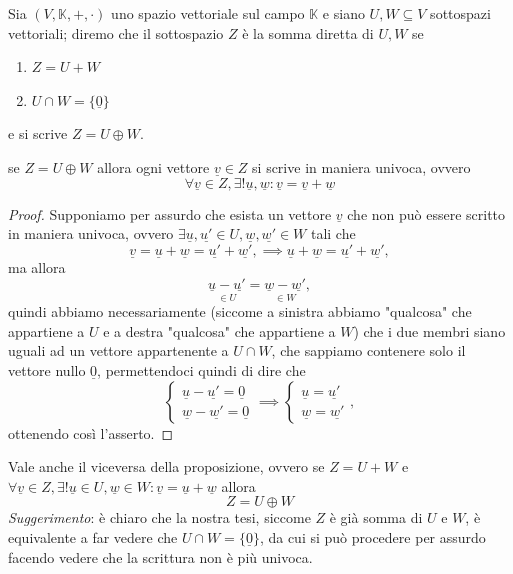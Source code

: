 \begin{definition}
    Sia $(V, \mathbb{K}, +, \cdot)$ uno spazio vettoriale sul campo $\mathbb{K}$ e siano $U, W \subseteq V$ sottospazi vettoriali; diremo che il sottospazio $Z$ è la somma diretta di $U, W$ se
    \begin{enumerate}[label=\protect\circled{\arabic*}]
        \item $Z = U + W$
        \item $U \cap W = \{ \underline{0} \}$
    \end{enumerate}
    e si scrive $Z = U \oplus W$.
\end{definition}
\begin{prop}
    se $Z = U \oplus W$ allora ogni vettore $\underline{v} \in Z$ si scrive in maniera univoca, ovvero
    $$
        \forall \underline{v} \in Z, \exists! \underline{u}, \underline{w} : \underline{v} = \underline{v} + \underline{w}
    $$
\end{prop}
\begin{proof}
    Supponiamo per assurdo che esista un vettore $\underline{v}$ che non può essere scritto in maniera univoca, ovvero $\exists \underline{u}, \underline{u'} \in U, \underline{w}, \underline{w'} \in W$ tali che
    $$
        \underline{v} = \underline{u} + \underline{w} = \underline{u'} + \underline{w'}, \implies \underline{u} + \underline{w} = \underline{u'} + \underline{w'},
    $$
    ma allora
    $$
        \underset{\in U}{\underline{u} - \underline{u'}} = \underset{\in W}{\underline{w} - \underline{w'}},
    $$
    quindi abbiamo necessariamente (siccome a sinistra abbiamo "qualcosa" che appartiene a $U$ e a destra "qualcosa" che appartiene a $W$) che i due membri siano uguali ad un vettore appartenente a $U \cap W$, che sappiamo contenere solo il vettore nullo $\underline{0}$, permettendoci quindi di dire che
    $$
        \begin{cases}
            \underline{u} - \underline{u'} = \underline{0} \\
            \underline{w} - \underline{w'} = \underline{0}
        \end{cases} \implies \begin{cases}
            \underline{u} = \underline{u'} \\
            \underline{w} = \underline{w'}
        \end{cases},
    $$
    ottenendo così l'asserto.
\end{proof}
\begin{exercise}
    \label{ex:1.11}
    Vale anche il viceversa della proposizione, ovvero se $Z = U + W$ e $\forall \underline{v} \in Z, \exists! \underline{u} \in U, \underline{w} \in W : \underline{v} = \underline{u} + \underline{w}$ allora
    $$
        Z = U \oplus W
    $$
    \emph{Suggerimento}: è chiaro che la nostra tesi, siccome $Z$ è già somma di $U$ e $W$, è equivalente a far vedere che $U \cap W = \{ \underline{0} \}$, da cui si può procedere per assurdo facendo vedere che la scrittura non è più univoca.
\end{exercise}
